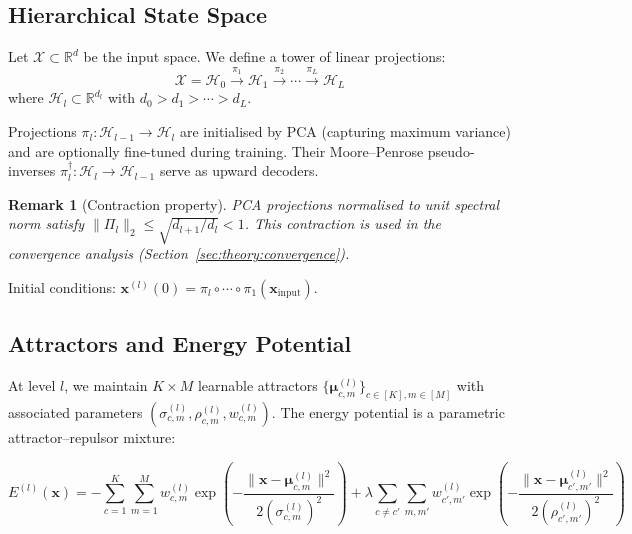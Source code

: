 \documentclass[11pt,a4paper]{article}
\newtheorem{remark}[theorem]{Remark}
\begin{document}
\subsection{Hierarchical State Space}

Let $\mathcal{X} \subset \mathbb{R}^d$ be the input space. We define a tower of linear
projections:
\begin{equation}
  \mathcal{X} = \mathcal{H}_0
  \xrightarrow{\pi_1} \mathcal{H}_1
  \xrightarrow{\pi_2} \cdots
  \xrightarrow{\pi_L} \mathcal{H}_L
\end{equation}
where $\mathcal{H}_l \subset \mathbb{R}^{d_l}$ with $d_0 > d_1 > \cdots > d_L$.

Projections $\pi_l : \mathcal{H}_{l-1} \to \mathcal{H}_l$ are initialised by PCA (capturing
maximum variance) and are optionally fine-tuned during training. Their Moore--Penrose
pseudo-inverses $\pi_l^\dagger : \mathcal{H}_l \to \mathcal{H}_{l-1}$ serve as upward
decoders.

\begin{remark}[Contraction property]
PCA projections normalised to unit spectral norm satisfy
$\|\Pi_l\|_2 \le \sqrt{d_{l+1}/d_l} < 1$.
This contraction is used in the convergence analysis (Section~\ref{sec:theory:convergence}).
\end{remark}

Initial conditions: $\mathbf{x}^{(l)}(0) = \pi_l \circ \cdots \circ \pi_1(\mathbf{x}_{\mathrm{input}})$.

\subsection{Attractors and Energy Potential}

At level $l$, we maintain $K \times M$ learnable attractors
$\{\boldsymbol{\mu}^{(l)}_{c,m}\}_{c \in [K], m \in [M]}$
with associated parameters $(\sigma^{(l)}_{c,m}, \rho^{(l)}_{c,m}, w^{(l)}_{c,m})$.
The energy potential is a parametric attractor--repulsor mixture:

\begin{equation}
  E^{(l)}(\mathbf{x}) = -\sum_{c=1}^{K} \sum_{m=1}^{M} w_{c,m}^{(l)}
    \exp\!\left(-\frac{\|\mathbf{x} - \boldsymbol{\mu}_{c,m}^{(l)}\|^2}
                      {2(\sigma_{c,m}^{(l)})^2}\right)
  + \lambda \sum_{c \ne c'} \sum_{m,m'} w_{c',m'}^{(l)}
    \exp\!\left(-\frac{\|\mathbf{x} - \boldsymbol{\mu}_{c',m'}^{(l)}\|^2}
                      {2(\rho_{c',m'}^{(l)})^2}\right)
\label{eq:energy}
\end{equation}
\end{document}
